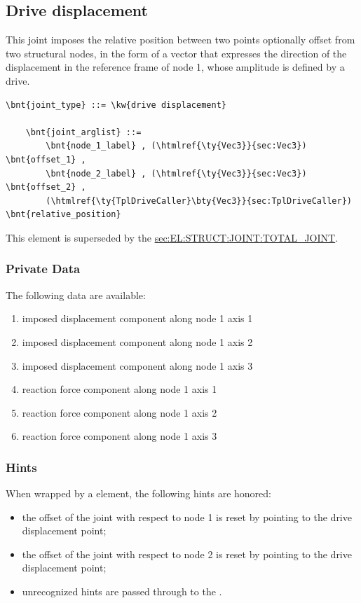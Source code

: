 \subsection{Drive displacement}
\label{sec:EL:JOINT:DRIVEDISPLACEMENT}
This joint imposes the relative position between two points 
optionally offset from two structural nodes,
in the form of a vector that expresses the direction of the displacement
in the reference frame of node 1, whose amplitude is defined by a drive.
\begin{Verbatim}[commandchars=\\\{\}]
    \bnt{joint_type} ::= \kw{drive displacement}

    \bnt{joint_arglist} ::= 
        \bnt{node_1_label} , (\htmlref{\ty{Vec3}}{sec:Vec3}) \bnt{offset_1} ,
        \bnt{node_2_label} , (\htmlref{\ty{Vec3}}{sec:Vec3}) \bnt{offset_2} ,
        (\htmlref{\ty{TplDriveCaller}\bty{Vec3}}{sec:TplDriveCaller}) \bnt{relative_position}
\end{Verbatim}
This element is superseded by the
\hyperref{\kw{total joint}}{\kw{total joint}, see Section~}{}{sec:EL:STRUCT:JOINT:TOTAL_JOINT}.

\subsubsection{Private Data}
The following data are available:
\begin{enumerate}
\item {} imposed displacement component along node 1 axis 1
\item {} imposed displacement component along node 1 axis 2
\item {} imposed displacement component along node 1 axis 3
\item {} reaction force component along node 1 axis 1
\item {} reaction force component along node 1 axis 2
\item {} reaction force component along node 1 axis 3
\end{enumerate}

\subsubsection{Hints}
When wrapped by a  element, the following hints are honored:
\begin{itemize}
\item {} the offset of the joint
with respect to node 1 is reset by pointing 
to the drive displacement point;
\item {} the offset of the joint
with respect to node 2 is reset by pointing 
to the drive displacement point;
\item unrecognized hints are passed through to the .
\end{itemize}



